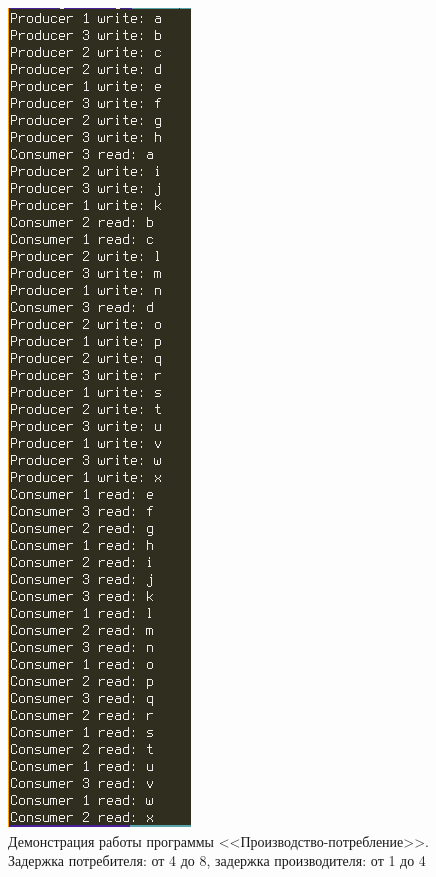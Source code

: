 \documentclass[12pt]{report}
\begin{document}
\begin{figure}[H]
	\centering
	\includegraphics[scale=0.75]{img/prod-cons-05.png}
	\caption{Демонстрация работы программы <<Производство-потребление>>. Задержка потребителя: от 4 до 8, задержка производителя: от 1 до 4}
	\label{fig:task01-05}
\end{figure}
\end{document}
